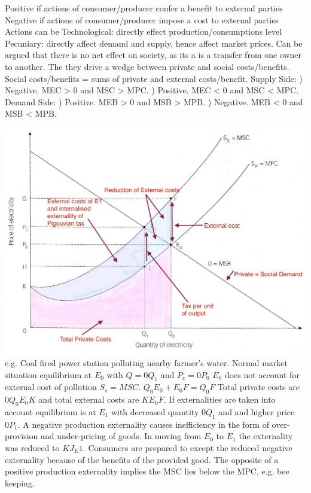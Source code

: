\documentclass[12pt]{examnotes}
\begin{document}
\ra Positive if actions of consumer/producer confer a benefit to external parties
\ra Negative if actions of consumer/producer impose a cost to external parties
\ra Actions can be 
 Technological: directly effect production/consumptions level 
 Pecuniary: directly affect demand and supply, hence affect market prices. Can be argued that there is no net effect on society, as its a is a transfer from one owner to another.
\ra The they drive a wedge between private and social costs/benefits.
\ra Social costs/benefits = sums of private and external costs/benefit.
\ra Supply Side:
) Negative. MEC > 0 and MSC > MPC.
) Positive. MEC < 0 and MSC < MPC. 
\ra Demand Side:
) Positive. MEB > 0 and MSB > MPB. 
) Negative. MEB < 0 and MSB < MPB.
 
\includegraphics[scale=0.3]{./imgs/33.jpg}
\ra e.g. Coal fired power station polluting nearby farmer's water.
\ra Normal market situation equilibrium at $E_0$ with $Q= 0Q_1$ and $P_e=0P_0 $ 
\ra $E_0$ does not account for external cost of pollution $S_s=MSC$.
\ra $Q_0E_0 + E_0F = Q_0F$
\ra Total private costs are $0Q_0E_0K$ and total external costs are $KE_0F$. 
\ra If externalities are taken into account equilibrium is at $E_1$ with decreased quantity $0Q_1$ and and higher price $0P_1$.
\ra A negative production externality causes inefficiency in the form of over-provision and under-pricing of goods.
\ra In moving from $E_0$ to $E_1$ the externality was reduced to $KJ_E1$.
\ra Consumers are prepared to except the reduced negative externality because of the benefits of the provided good.
\ra The opposite of a positive production externality implies the MSC lies below the MPC, e.g. bee keeping.
\end{document}
